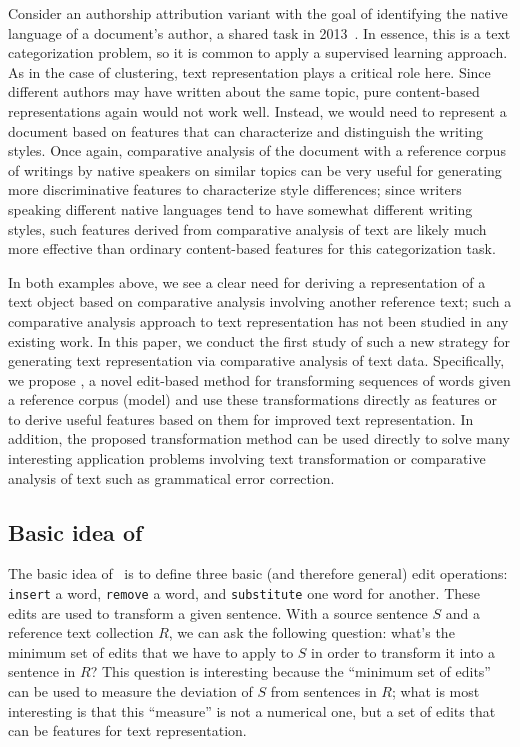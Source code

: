 Consider an authorship attribution variant with the goal of identifying the
native language of a document's author, a shared task in 2013~\cite{nli-task}.
In essence, this is a text categorization problem, so it is common to apply a
supervised learning approach. As in the case of clustering, text representation
plays a critical role here. Since different authors may have written about the
same topic, pure content-based representations again would not work well.
Instead, we would need to represent a document based on features that can
characterize and distinguish the writing styles. Once again, comparative
analysis of the document with a reference corpus of writings by native speakers
on similar topics can be very useful for generating more discriminative features
to characterize style differences; since writers speaking different native
languages tend to have somewhat different writing styles, such features derived
from comparative analysis of text are likely much more effective than ordinary
content-based features for this categorization task.

In both examples above, we see a clear need for deriving a representation of a
text object based on comparative analysis involving another reference text; such
a comparative analysis approach to text representation has not been studied in
any existing work. In this paper, we conduct the first study of such a new
strategy for generating text representation via comparative analysis of text
data. Specifically, we propose \sd, a novel edit-based method for transforming
sequences of words given a reference corpus (model) and use these
transformations directly as features or to derive useful features based on them
for improved text representation. In addition, the proposed transformation
method can be used directly to solve many interesting application problems
involving text transformation or comparative analysis of text such as
grammatical error correction.

\subsection{Basic idea of \sd}

The basic idea of \sd~is to define three basic (and therefore general) edit
operations: \texttt{insert} a word, \texttt{remove} a word, and
\texttt{substitute} one word for another. These edits are used to transform a
given sentence. With a source sentence $S$ and a reference text collection $R$,
we can ask the following question: what's the minimum set of edits that we have
to apply to $S$ in order to transform it into a sentence in $R$? This question
is interesting because the ``minimum set of edits'' can be used to measure the
deviation of $S$ from sentences in $R$; what is most interesting is that this
``measure'' is not a numerical one, but a set of edits that can be features for
text representation.

